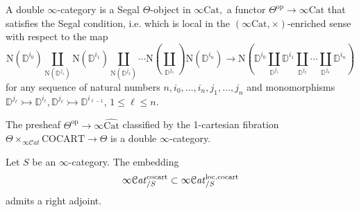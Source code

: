 \documentclass[10pt,oneside]{article}
\numberwithin{equation}{section} %
\numberwithin{figure}{section} %
\theoremstyle{plain}
\theoremstyle{definition}
\newcommand{\bD}{{\mathbb D}}
\newcommand{\N}{{\mathrm N}}
\newcommand{\op}{\mathrm{op}}
\newcommand{\Cat}{\mathrm{Cat}}
\newcommand{\cocart}{{\mathrm{cocart}}}
\newcommand{\scat}{\mathcal{C}\mathit{at}}
\begin{document}
\begin{definition}
A double $\infty$-category is a Segal $\Theta$-object in $\infty\Cat,$ 
a functor $\Theta^\op \to \infty\Cat$ that satisfies the Segal condition,
i.e. which is local in the $(\infty\Cat, \times)$-enriched sense with 
respect to the map 
$$ \N(\bD^{i_0}) \coprod_{\N(\bD^{j_1})} \N(\bD^{i_1})\coprod_{\N(\bD^{j_2})} \cdots \N(\coprod_{\bD^{j_n}}) \N(\bD^{i_n}) \to \N(\bD^{i_0} \coprod_{\bD^{j_1}} \bD^{i_1} \coprod_{\bD^{j_2}} \cdots \coprod_{\bD^{j_n}} \bD^{i_n})$$
for any sequence of natural numbers $n, i_0,\ldots, i_n, j_1,\ldots, j_n$ and monomorphisms 
$ \bD^{j_\ell} \rightarrowtail \bD^{i_\ell},\bD^{j_\ell} \rightarrowtail \bD^{i_{\ell-1}}$, $ 1 \leq \ell \leq n$.

\end{definition}

\begin{corollary}
The presheaf $\Theta^\op \to \infty\widehat{\Cat}$ classified by the 1-cartesian fibration $\Theta \times_{\infty\scat} \mathrm{COCART} \to \Theta$ is a double $\infty$-category.

\end{corollary}

\begin{theorem}\label{expright} Let $S$ be an $\infty$-category.
The embedding $$\infty\scat^\cocart_{/S} \subset \infty\scat^{\mathrm{loc}. \vspace{1mm} \cocart}_{/S}$$
admits a right adjoint.

    
\end{theorem}
\end{document}
